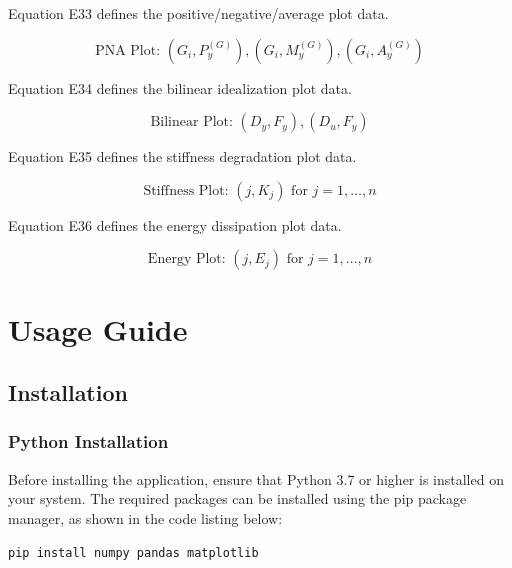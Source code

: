 \documentclass[11pt,a4paper]{article}
\begin{document}
Equation E33 defines the positive/negative/average plot data.

\begin{equation}
\text{PNA Plot: } (G_i, P_y^{(G)}), (G_i, M_y^{(G)}), (G_i, A_y^{(G)})
\tag{E33}
\label{eq:E33}
\end{equation}

Equation E34 defines the bilinear idealization plot data.

\begin{equation}
\text{Bilinear Plot: } (D_y, F_y), (D_u, F_y)
\tag{E34}
\label{eq:E34}
\end{equation}

Equation E35 defines the stiffness degradation plot data.

\begin{equation}
\text{Stiffness Plot: } (j, K_j) \text{ for } j = 1, \ldots, n
\tag{E35}
\label{eq:E35}
\end{equation}

Equation E36 defines the energy dissipation plot data.

\begin{equation}
\text{Energy Plot: } (j, E_j) \text{ for } j = 1, \ldots, n
\tag{E36}
\label{eq:E36}
\end{equation}

\section{Usage Guide}

\subsection{Installation}

\subsubsection{Python Installation}

Before installing the application, ensure that Python 3.7 or higher is installed on your system. The required packages can be installed using the pip package manager, as shown in the code listing below:

\begin{lstlisting}
pip install numpy pandas matplotlib
\end{lstlisting}
\end{document}
